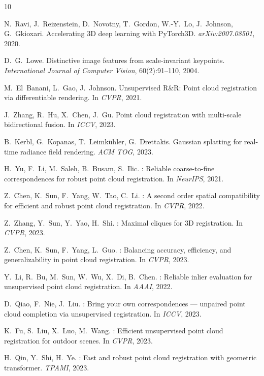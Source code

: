 \documentclass[11pt,a4paper]{article}
\begin{document}
\begin{thebibliography}{10}

N.~Ravi, J.~Reizenstein, D.~Novotny, T.~Gordon, W.-Y.~Lo, J.~Johnson, G.~Gkioxari.
\newblock Accelerating 3D deep learning with {PyTorch3D}.
\newblock \emph{arXiv:2007.08501}, 2020.

D.~G.~Lowe.
\newblock Distinctive image features from scale-invariant keypoints.
\newblock \emph{International Journal of Computer Vision}, 60(2):91--110, 2004.

M.~El~Banani, L.~Gao, J.~Johnson.
\newblock Unsupervised {R\&R}: Point cloud registration via differentiable rendering.
\newblock In \emph{CVPR}, 2021.

J.~Zhang, R.~Hu, X.~Chen, J.~Gu.
\newblock Point cloud registration with multi-scale bidirectional fusion.
\newblock In \emph{ICCV}, 2023.

B.~Kerbl, G.~Kopanas, T.~Leimk{\"u}hler, G.~Drettakis.
 Gaussian splatting for real-time radiance field rendering.
\newblock \emph{ACM TOG}, 2023.

H.~Yu, F.~Li, M.~Saleh, B.~Busam, S.~Ilic.
: Reliable coarse-to-fine correspondences for robust point cloud registration.
\newblock In \emph{NeurIPS}, 2021.

Z.~Chen, K.~Sun, F.~Yang, W.~Tao, C.~Li.
: A second order spatial compatibility for efficient and robust point cloud registration.
\newblock In \emph{CVPR}, 2022.

Z.~Zhang, Y.~Sun, Y.~Yao, H.~Shi.
: Maximal cliques for 3D registration.
\newblock In \emph{CVPR}, 2023.

Z.~Chen, K.~Sun, F.~Yang, L.~Guo.
: Balancing accuracy, efficiency, and generalizability in point cloud registration.
\newblock In \emph{CVPR}, 2023.

Y.~Li, R.~Bu, M.~Sun, W.~Wu, X.~Di, B.~Chen.
: Reliable inlier evaluation for unsupervised point cloud registration.
\newblock In \emph{AAAI}, 2022.

D.~Qiao, F.~Nie, J.~Liu.
: Bring your own correspondences — unpaired point cloud completion via unsupervised registration.
\newblock In \emph{ICCV}, 2023.

K.~Fu, S.~Liu, X.~Luo, M.~Wang.
: Efficient unsupervised point cloud registration for outdoor scenes.
\newblock In \emph{CVPR}, 2023.

H.~Qin, Y.~Shi, H.~Ye.
: Fast and robust point cloud registration with geometric transformer.
\newblock \emph{TPAMI}, 2023.

\end{thebibliography}
\end{document}
